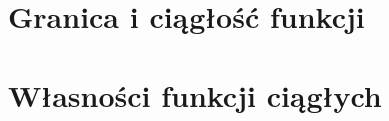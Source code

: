 \documentclass{article}
\begin{document}
\section{Granica i ciągłość funkcji}
\section{Własności funkcji ciągłych}
\end{document}
